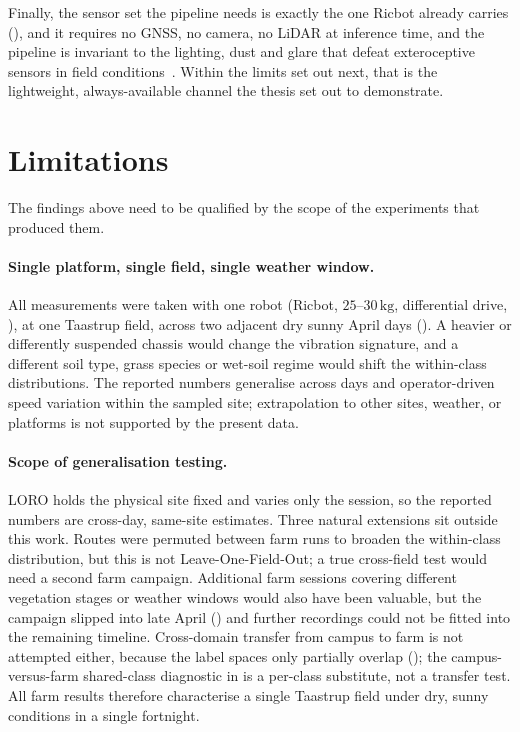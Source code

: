 Finally, the sensor set the pipeline needs is exactly the one Ricbot already carries (), and it requires no GNSS, no camera, no LiDAR at inference time, and the pipeline is invariant to the lighting, dust and glare that defeat exteroceptive sensors in field conditions~\cite{Reina2016}. Within the limits set out next, that is the lightweight, always-available channel the thesis set out to demonstrate.

\section{Limitations}
\label{sec:disc_limitations}

The findings above need to be qualified by the scope of the experiments that produced them.

\paragraph{Single platform, single field, single weather window.} All measurements were taken with one robot (Ricbot, $25$--$30\,\text{kg}$, differential drive, ), at one Taastrup field, across two adjacent dry sunny April days (). A heavier or differently suspended chassis would change the vibration signature, and a different soil type, grass species or wet-soil regime would shift the within-class distributions. The reported numbers generalise across days and operator-driven speed variation within the sampled site; extrapolation to other sites, weather, or platforms is not supported by the present data.

\paragraph{Scope of generalisation testing.} LORO holds the physical site fixed and varies only the session, so the reported numbers are cross-day, same-site estimates. Three natural extensions sit outside this work. Routes were permuted between farm runs to broaden the within-class distribution, but this is not Leave-One-Field-Out; a true cross-field test would need a second farm campaign. Additional farm sessions covering different vegetation stages or weather windows would also have been valuable, but the campaign slipped into late April () and further recordings could not be fitted into the remaining timeline. Cross-domain transfer from campus to farm is not attempted either, because the label spaces only partially overlap (); the campus-versus-farm shared-class diagnostic in  is a per-class substitute, not a transfer test. All farm results therefore characterise a single Taastrup field under dry, sunny conditions in a single fortnight.

